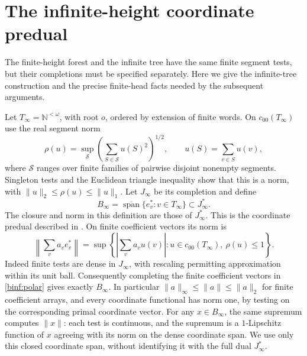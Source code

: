 \section{The infinite-height coordinate predual}\label{binf:definition}

The finite-height forest and the infinite tree have the same finite
segment tests, but their completions must be specified separately.
Here we give the infinite-tree construction and the precise finite-head
facts needed by the subsequent arguments.

Let $T_\infty=\mathbb N^{<\omega}$, with root $o$, ordered by extension
of finite words. On $c_{00}(T_\infty)$ use the real segment norm
\[
 \rho(u)=\sup_{\mathcal S}
 \left(\sum_{S\in\mathcal S}u(S)^2\right)^{1/2},
 \qquad u(S)=\sum_{v\in S}u(v),
\]
where $\mathcal S$ ranges over finite families of pairwise disjoint
nonempty segments. Singleton tests and the Euclidean triangle inequality show that this is
a norm, with $\|u\|_2\le\rho(u)\le\|u\|_1$.
Let $J_\infty$ be its completion and define
\[
 B_\infty=\overline{\operatorname{span}}\{e_v^*:v\in T_\infty\}
 \subset J_\infty^*.
\]
The closure and norm in this definition are those of $J_\infty^*$.
This is the coordinate predual described in
\cite[Section~2.II]{Banakh2000}. On finite coefficient vectors its norm is
\begin{equation}\label{binf:polar}
 \left\|\sum_v a_v e_v^*\right\|
 =\sup\left\{\left|\sum_v a_v u(v)\right|:
                 u\in c_{00}(T_\infty),\ \rho(u)\le1\right\}.
\end{equation}
Indeed finite tests are dense in $J_\infty$, with rescaling permitting
approximation within its unit ball. Consequently completing the finite
coefficient vectors in \eqref{binf:polar} gives exactly $B_\infty$.
In particular $\|a\|_\infty\le\|a\|\le\|a\|_2$ for finite
coefficient arrays, and every coordinate functional has norm one, by
testing on the corresponding primal coordinate vector.
For any $x\in B_\infty$, the same supremum computes $\|x\|$:
each test is continuous, and the supremum is a $1$-Lipschitz function
of $x$ agreeing with its norm on the dense coordinate span. We use only
this closed coordinate span, without identifying it with the full dual
$J_\infty^*$.

